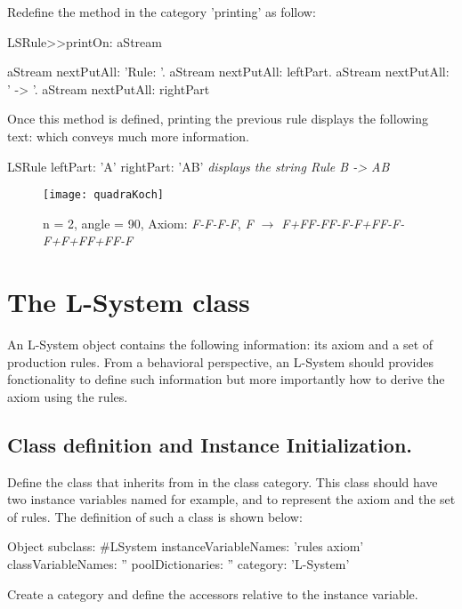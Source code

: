 Redefine the method  in the category 'printing' as follow: 

\begin{method}
LSRule>>printOn: aStream

   aStream nextPutAll: 'Rule: '.
   aStream nextPutAll: leftPart.
   aStream nextPutAll: ' -> '.
   aStream nextPutAll: rightPart
\end{method}

Once this method is defined, printing the previous rule displays the
following text:  which conveys much more information. 

\begin{scriptwithouttitle}
LSRule leftPart: 'A' rightPart: 'AB'
\emph{displays the string Rule B -> AB} 
\end{scriptwithouttitle}


\begin{figure}[!htbp]
\centerline{\texttt{[image: quadraKoch]}}
\caption{n = 2, angle = 90, Axiom: \emph{F-F-F-F}, \emph{F $\rightarrow$ F+FF-FF-F-F+FF-F-F+F+FF+FF-F}}
\label{fig:quadraKoch}
\end{figure}


\section{The L-System class}
An L-System object contains the following information: its axiom and a
set of production rules. From a behavioral perspective, an L-System
should provides fonctionality to define such information but more
importantly how to derive the axiom using the rules.


\subsection{Class definition and Instance Initialization.} 
Define the class  that inherits from  in the
 class category. This class should have two instance
variables named for example,  and  to represent
the axiom and the set of rules.  The definition of such a class is
shown below:

\begin{classdef}
Object subclass: #LSystem
   instanceVariableNames: 'rules axiom'
   classVariableNames: ''
   poolDictionaries: ''
   category: 'L-System'
\end{classdef}

Create a category  and define the accessors relative
to the  instance variable.

